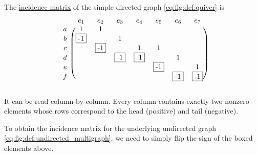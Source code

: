 \begin{example}\label{ex:quiver_matrices}
  The \hyperref[def:quiver_incidence_matrix]{incidence matrix} of the simple directed graph \eqref{eq:fig:def:quiver} is
  \begin{equation}\label{ex:quiver_matrices/incidence}
    \begin{blockarray}{cccccccc}
        & e_1       & e_2       & e_3       & e_4       & e_5       & e_6       & e_7       \\
      \begin{block}{c(ccccccc)}
      a & 1         & 1         &           &           &           &           &           \\
      b & \fbox{-1} &           & 1         &           &           &           &           \\
      c &           & \fbox{-1} &           & 1         & 1         &           &           \\
      d &           &           & \fbox{-1} & \fbox{-1} &           & 1         &           \\
      e &           &           &           &           & \fbox{-1} &           & 1         \\
      f &           &           &           &           &           & \fbox{-1} & \fbox{-1} \\
      \end{block}
    \end{blockarray}
  \end{equation}

  It can be read column-by-column. Every column contains exactly two nonzero elements whose rows correspond to the head (positive) and tail (negative).

  To obtain the incidence matrix for the underlying undirected graph \eqref{eq:fig:def:undirected_multigraph}, we need to simply flip the sign of the boxed elements above.


\end{example}
